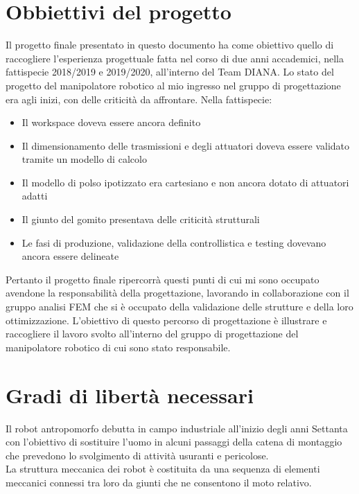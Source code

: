 \documentclass[%
corpo=11pt,
twoside,
 stile=classica,
oldstyle,
greek,%
]{toptesi}
\begin{document}
	\section{Obbiettivi del progetto}
	Il progetto finale presentato in questo documento ha come obiettivo quello di raccogliere l'esperienza progettuale fatta nel corso di due anni accademici, nella fattispecie 2018/2019 e 2019/2020, all'interno del Team DIANA. Lo stato del progetto del manipolatore robotico al mio ingresso nel gruppo di progettazione era agli inizi, con delle criticità da affrontare. Nella fattispecie:
	\begin{itemize}
		\item Il workspace doveva essere ancora definito
		\item Il dimensionamento delle trasmissioni e degli attuatori doveva essere validato tramite un modello di calcolo
		\item Il modello di polso ipotizzato era cartesiano e non ancora dotato di attuatori adatti
		\item Il giunto del gomito presentava delle criticità strutturali 
		\item Le fasi di produzione, validazione della controllistica e testing dovevano ancora essere delineate
	\end{itemize}
	
	Pertanto il progetto finale ripercorrà questi punti di cui mi sono occupato avendone la responsabilità della progettazione, lavorando in collaborazione con il gruppo analisi FEM che si è occupato della validazione delle strutture e della loro ottimizzazione.  L'obiettivo di questo percorso di progettazione è illustrare e raccogliere il lavoro svolto all'interno del gruppo di progettazione del manipolatore robotico di cui sono stato responsabile. 
	
	
	\section{Gradi di libertà necessari}
	Il robot antropomorfo debutta in campo industriale all’inizio degli anni Settanta con l’obiettivo di sostituire l’uomo in alcuni passaggi della catena di montaggio che prevedono lo svolgimento di attività usuranti e pericolose. \\
	La struttura meccanica dei robot è costituita da una sequenza di elementi meccanici connessi tra loro da giunti che ne consentono il moto relativo.\\
	 
\end{document}
